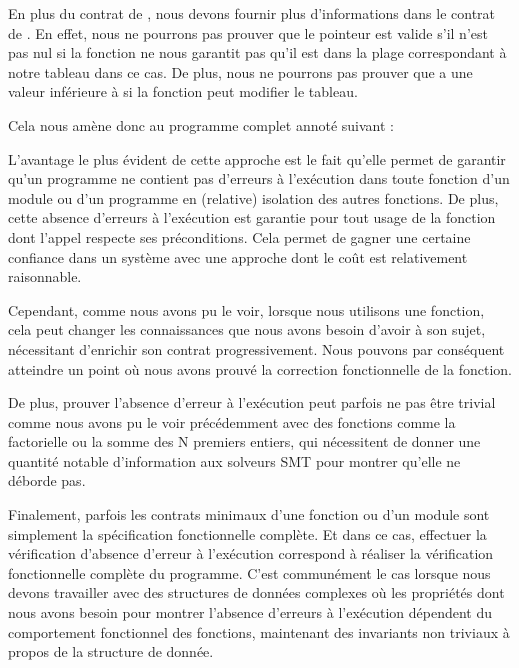 En plus du contrat de , nous devons fournir plus d'informations
dans le contrat de . En effet, nous ne pourrons pas prouver
que le pointeur est valide s'il n'est pas nul si la fonction ne nous garantit
pas qu'il est dans la plage correspondant à notre tableau dans ce cas. De plus,
nous ne pourrons pas prouver que  a une valeur inférieure à
 si la fonction peut modifier le tableau.


Cela nous amène donc au programme complet annoté suivant :






L'avantage le plus évident de cette approche est le fait qu'elle permet de garantir
qu'un programme ne contient pas d'erreurs à l'exécution dans toute fonction d'un
module ou d'un programme en (relative) isolation des autres fonctions. De plus,
cette absence d'erreurs à l'exécution est garantie pour tout usage de la fonction
dont l'appel respecte ses préconditions. Cela permet de gagner une certaine confiance
dans un système avec une approche dont le coût est relativement raisonnable.



Cependant, comme nous avons pu le voir, lorsque nous utilisons une fonction, cela
peut changer les connaissances que nous avons besoin d'avoir à son sujet, nécessitant
d'enrichir son contrat progressivement. Nous pouvons par conséquent atteindre un
point où nous avons prouvé la correction fonctionnelle de la fonction.



De plus, prouver l'absence d'erreur à l'exécution peut parfois ne pas être trivial
comme nous avons pu le voir précédemment avec des fonctions comme la factorielle ou
la somme des N premiers entiers, qui nécessitent de donner une quantité notable
d'information aux solveurs SMT pour montrer qu'elle ne déborde pas.



Finalement, parfois les contrats minimaux d'une fonction ou d'un module sont
simplement la spécification fonctionnelle complète. Et dans ce cas, effectuer la
vérification d'absence d'erreur à l'exécution correspond à réaliser la vérification
fonctionnelle complète du programme. C'est communément le cas lorsque nous devons
travailler avec des structures de données complexes où les propriétés dont nous
avons besoin pour montrer l'absence d'erreurs à l'exécution dépendent du
comportement fonctionnel des fonctions, maintenant des invariants non triviaux
à propos de la structure de donnée.


